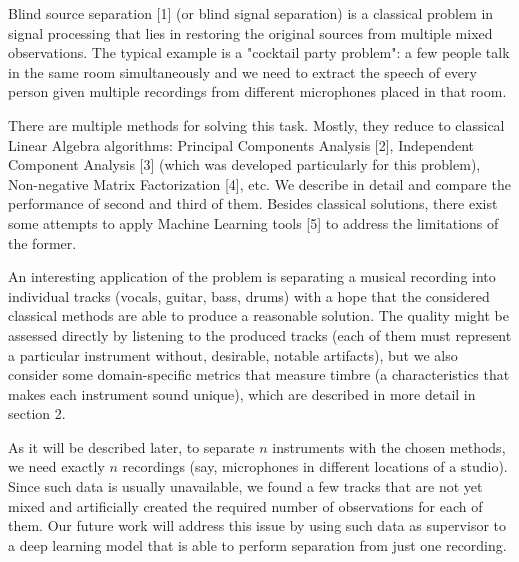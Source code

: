 \documentclass[../main.tex]{subfiles} %
\begin{document}

Blind source separation [1] (or blind signal separation) is a classical problem in signal processing that lies in restoring the original sources from multiple mixed observations. The typical example is a "cocktail party problem": a few people talk in the same room simultaneously and we need to extract the speech of every person given multiple recordings from different microphones placed in that room.

There are multiple methods for solving this task. Mostly, they reduce to classical Linear Algebra algorithms: Principal Components Analysis [2], Independent Component Analysis [3] (which was developed particularly for this problem), Non-negative Matrix Factorization [4], etc. We describe in detail and compare the performance of second and third of them. Besides classical solutions, there exist some attempts to apply Machine Learning tools [5] to address the limitations of the former.


An interesting application of the problem is separating a musical recording into individual tracks (vocals, guitar, bass, drums) with a hope that the considered classical methods are able to produce a reasonable solution. The quality might be assessed directly by listening to the produced tracks (each of them must represent a particular instrument without, desirable, notable artifacts), but we also consider some domain-specific metrics that measure timbre (a characteristics that makes each instrument sound unique), which are described in more detail in section 2. 


As it will be described later, to separate $n$ instruments with the chosen methods, we need exactly $n$ recordings (say, microphones in different locations of a studio). Since such data is usually unavailable, we found a few tracks that are not yet mixed and artificially created the required number of observations for each of them. Our future work will address this issue by using such data as supervisor to a deep learning model that is able to perform separation from just one recording.
 
\end{document}
